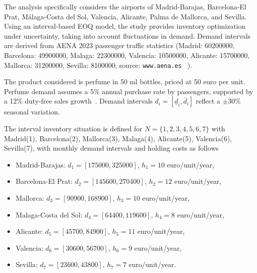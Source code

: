\documentclass[12pt]{article}
\begin{document}
The analysis specifically considers the airports of Madrid-Barajas, Barcelona-El Prat, Málaga-Costa del Sol, Valencia, Alicante, Palma de Mallorca, and Sevilla. Using an interval-based EOQ model, the study provides inventory optimization under uncertainty, taking into account fluctuations in demand. Demand intervals are derived from AENA 2023 passenger traffic statistics (Madrid: 60200000,
Barcelona: 49900000, Malaga: 22300000, Valencia: 10500000, Alicante:
15700000, Mallorca: 31200000, Sevilla: 8100000; source: \texttt{www.aena.es}~%
\cite{aena2023}). 

The product considered is perfume in 50 ml bottles, priced
at 50 euro per unit. Perfume demand assumes a 5\% annual purchase rate by
passengers, supported by a 12\% duty-free sales growth~\cite{Reuters2024}.
Demand intervals $d_{i}=[\underline{d}_{i},\overline{d}_{i}]$ reflect a $\pm
30\%$ seasonal variation. 

The interval inventory situation is defined for $N=\{1,2,3,4,5,6,7\}$ with Madrid(1), Barcelona(2), Mallorca(3), Malaga(4), Alicante(5), Valencia(6), Sevilla(7), with monthly demand intervals and holding costs as
follows 


\begin{itemize}
\item Madrid-Barajas: $d_1 = [175 000, 325 000]$, $h_1 = 10$ euro/unit/year,

\item Barcelona-El Prat: $d_2 = [145 600, 270 400]$, $h_2 = 12$
euro/unit/year,

\item Mallorca: $d_3 = [90 900, 168 900]$, $h_3 = 10$ euro/unit/year,

\item Malaga-Costa del Sol: $d_4 = [64 400, 119 600]$, $h_4 = 8$
euro/unit/year,

\item Alicante: $d_5 = [45 700, 84 900]$, $h_5 = 11$ euro/unit/year,

\item Valencia: $d_6 = [30 600, 56 700]$, $h_6 = 9$ euro/unit/year,


\item Sevilla: $d_7 = [23 600, 43 800]$, $h_7 = 7$ euro/unit/year.
\end{itemize}
\end{document}
